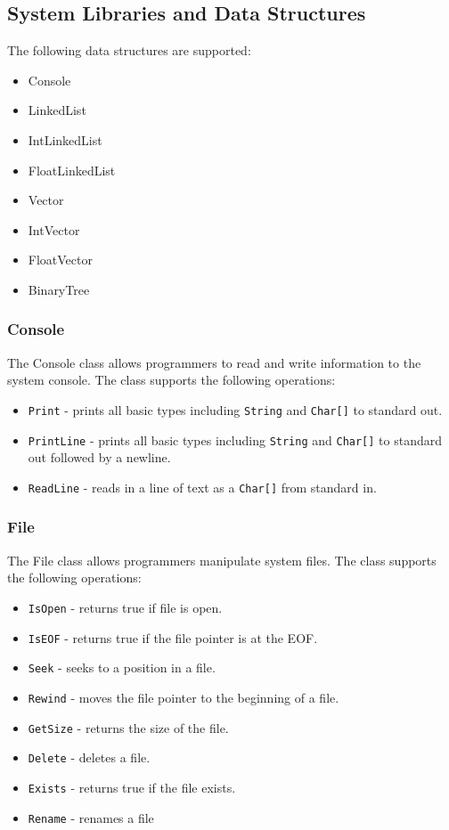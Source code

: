 \documentclass[12pt]{article}
\begin{document}
\subsection{System Libraries and Data Structures}
The following data structures are supported:
\begin{itemize}
    \item Console
    \item LinkedList
    \item IntLinkedList
    \item FloatLinkedList
    \item Vector
    \item IntVector
    \item FloatVector
    \item BinaryTree
\end{itemize}


\subsubsection{Console}
The Console class allows programmers to read and write information to the system console.    The class supports the following operations:
\begin{itemize}
    \item \texttt{Print} - prints all basic types including \texttt{String} and \texttt{Char[]} to standard out.
    \item \texttt{PrintLine} - prints all basic types including \texttt{String} and \texttt{Char[]} to standard out followed by a newline.
    \item \texttt{ReadLine} - reads in a line of text as a \texttt{Char[]} from standard in.
\end{itemize}

\subsubsection{File}
The File class allows programmers manipulate system files.    The class supports the following operations:
\begin{itemize}
    \item \texttt{IsOpen} - returns true if file is open.
    \item \texttt{IsEOF} - returns true if the file pointer is at the EOF.
    \item \texttt{Seek} - seeks to a position in a file.
    \item \texttt{Rewind} - moves the file pointer to the beginning of a file.
    \item \texttt{GetSize} - returns the size of the file.
    \item \texttt{Delete} - deletes a file.
    \item \texttt{Exists} - returns true if the file exists.
    \item \texttt{Rename} - renames a file
\end{itemize}
\end{document}
